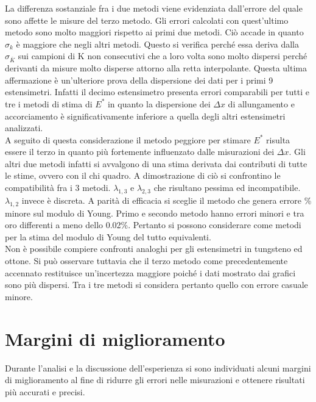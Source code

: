 \documentclass[a4paper,11pt,oneside]{article}
\begin{document}
La differenza sostanziale fra i due metodi viene evidenziata dall'errore del quale sono affette le misure del terzo metodo. Gli errori calcolati con quest'ultimo metodo sono molto maggiori rispetto ai primi due metodi. Ciò accade in quanto $\sigma_k$ è maggiore che negli altri metodi. Questo si verifica perché essa deriva dalla $\sigma_{\overline{K}}$ sui campioni di K non consecutivi che a loro volta sono molto dispersi perché derivanti da misure molto disperse attorno alla retta interpolante. Questa ultima affermazione è un'ulteriore prova della dispersione dei dati per i primi 9 estensimetri. Infatti il decimo estensimetro presenta errori comparabili per tutti e tre i metodi di stima di $E^{\ast}$ in quanto la dispersione dei $\Delta x$ di allungamento e accorciamento è significativamente inferiore a quella degli altri estensimetri analizzati.\\
A seguito di questa considerazione il metodo peggiore per stimare $E^{\ast}$  risulta essere il terzo in quanto più fortemente influenzato dalle misurazioni dei $\Delta x$. Gli altri due metodi infatti si avvalgono di una stima derivata dai contributi di tutte le stime, ovvero con il chi quadro. A dimostrazione di ciò si confrontino le compatibilità fra i 3 metodi. $\lambda_{1,3}$ e $\lambda_{2,3}$ che risultano pessima ed incompatibile. $\lambda_{1,2}$ invece è discreta. A parità di efficacia si sceglie il metodo che genera errore \% minore sul modulo di Young. Primo e secondo metodo hanno errori minori e tra oro differenti a meno dello 0.02\%. Pertanto si possono considerare come metodi per la stima del modulo di Young del tutto equivalenti.\\
Non è possibile compiere confronti analoghi per gli estensimetri in tungsteno ed ottone. Si può osservare tuttavia che il terzo metodo come precedentemente accennato restituisce un'incertezza maggiore poiché i dati mostrato dai grafici sono più dispersi. Tra i tre metodi si considera pertanto quello con errore casuale minore.







\section{Margini di miglioramento}
Durante l'analisi e la discussione dell'esperienza si sono individuati alcuni margini di miglioramento al fine di ridurre gli errori nelle misurazioni e ottenere risultati più accurati e precisi.
\end{document}
